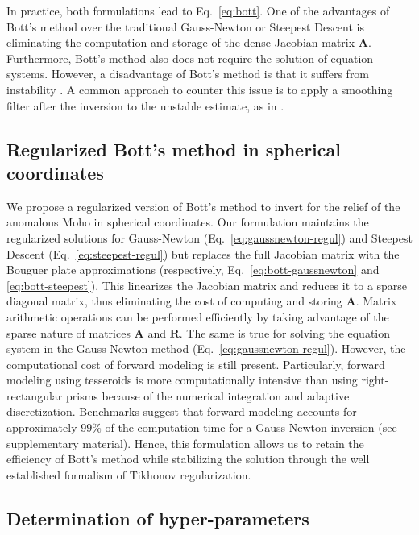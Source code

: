 \documentclass[extra,mreferee]{gji}
\begin{document}
\noindent
In practice, both formulations lead to Eq.~\ref{eq:bott}.
One of the advantages of Bott's method over the traditional Gauss-Newton or
Steepest Descent is eliminating the computation and storage of the dense
Jacobian matrix $\mathbf{A}$.
Furthermore, Bott's method also does not require the solution of equation
systems.
However, a disadvantage of Bott's method is that it suffers from instability
\citep{silva2014}.
A common approach to counter this issue is to apply a smoothing filter after
the inversion to the unstable estimate, as in \citet{silva2014}.



\subsection{Regularized Bott's method in spherical coordinates}

We propose a regularized version of Bott's method to invert for the relief of
the anomalous Moho in spherical coordinates.
Our formulation maintains the regularized solutions
for Gauss-Newton (Eq.~\ref{eq:gaussnewton-regul}) and
Steepest Descent (Eq.~\ref{eq:steepest-regul})
but replaces the full Jacobian matrix with the Bouguer plate approximations
(respectively, Eq.~\ref{eq:bott-gaussnewton} and \ref{eq:bott-steepest}).
This linearizes the Jacobian matrix and reduces it to a sparse diagonal matrix,
thus eliminating the cost of computing and storing $\mathbf{A}$.
Matrix arithmetic operations can be performed efficiently by taking advantage
of the sparse nature of matrices $\mathbf{A}$ and $\mathbf{R}$.
The same is true for solving the equation system in the Gauss-Newton method
(Eq.~\ref{eq:gaussnewton-regul}).
However, the computational cost of forward modeling is still present.
Particularly, forward modeling using tesseroids is more computationally
intensive than using right-rectangular prisms
because of the numerical integration and adaptive discretization.
Benchmarks suggest that
forward modeling accounts for approximately $99\%$
of the computation time for a Gauss-Newton inversion
(see supplementary material).
Hence, this formulation allows us to retain the efficiency of Bott's method
while stabilizing the solution through the well established formalism of
Tikhonov regularization.



\subsection{Determination of hyper-parameters}
\end{document}
